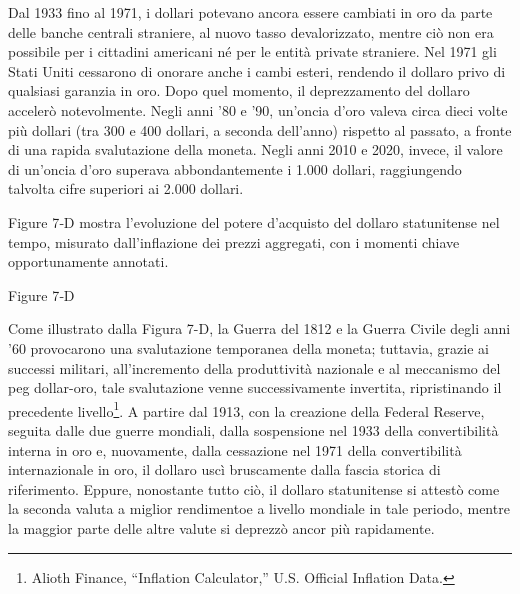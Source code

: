\documentclass[
  a5paper,
  smalldemyvopaper,10pt,twoside,onecolumn,openright,extrafontsizes,hidelinks]{memoir}
\begin{document}
Dal 1933 fino al 1971, i dollari potevano ancora essere cambiati in oro
da parte delle banche centrali straniere, al nuovo tasso devalorizzato,
mentre ciò non era possibile per i cittadini americani né per le entità
private straniere. Nel 1971 gli Stati Uniti cessarono di onorare anche i
cambi esteri, rendendo il dollaro privo di qualsiasi garanzia in oro.
Dopo quel momento, il deprezzamento del dollaro accelerò notevolmente.
Negli anni '80 e '90, un'oncia d'oro valeva circa dieci volte più
dollari (tra 300 e 400 dollari, a seconda dell'anno) rispetto al
passato, a fronte di una rapida svalutazione della moneta. Negli anni
2010 e 2020, invece, il valore di un'oncia d'oro superava
abbondantemente i 1.000 dollari, raggiungendo talvolta cifre superiori
ai 2.000 dollari.

Figure 7‑D mostra l'evoluzione del potere d'acquisto del dollaro
statunitense nel tempo, misurato dall'inflazione dei prezzi aggregati,
con i momenti chiave opportunamente annotati.

Figure 7‑D

Come illustrato dalla Figura 7-D, la Guerra del 1812 e la Guerra Civile
degli anni '60 provocarono una svalutazione temporanea della moneta;
tuttavia, grazie ai successi militari, all'incremento della produttività
nazionale e al meccanismo del peg dollar-oro, tale svalutazione venne
successivamente invertita, ripristinando il precedente
livello\footnote{Alioth Finance, ``Inflation Calculator,'' U.S. Official
  Inflation Data.}. A partire dal 1913, con la creazione della Federal
Reserve, seguita dalle due guerre mondiali, dalla sospensione nel 1933
della convertibilità interna in oro e, nuovamente, dalla cessazione nel
1971 della convertibilità internazionale in oro, il dollaro uscì
bruscamente dalla fascia storica di riferimento. Eppure, nonostante
tutto ciò, il dollaro statunitense si attestò come la seconda valuta a
miglior rendimentoe a livello mondiale in tale periodo, mentre la
maggior parte delle altre valute si deprezzò ancor più rapidamente.
\end{document}
